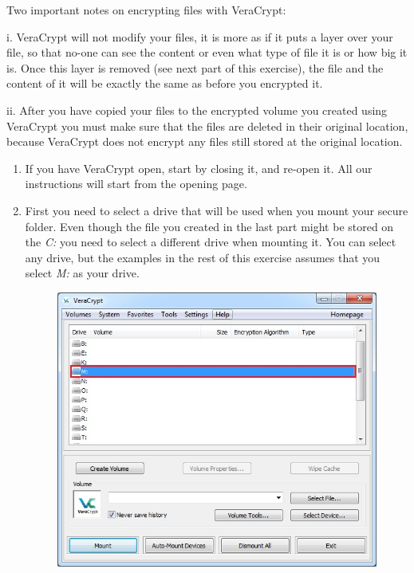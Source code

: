 \documentclass{tufte-handout}
\begin{document}
	Two important notes on encrypting files with VeraCrypt:
	
	i. VeraCrypt will not modify your files, it is more as if it puts a layer over your file, so that no-one can see the content or even what type of file it is or how big it is. Once this layer is removed (see next part of this exercise), the file and the content of it will be exactly the same as before you encrypted it.
	
	ii. After you have copied your files to the encrypted volume you created using VeraCrypt you must make sure that the files are deleted in their original location, because VeraCrypt does not encrypt any files still stored at the original location.
	

\begin{enumerate}
	\item If you have VeraCrypt open, start by closing it, and re-open it. All our instructions will start from the opening page.
	
	\item First you need to select a drive that will be used when you mount your secure folder. Even though the file you created in the last part might be stored on the \textit{C:} you need to select a different drive when mounting it. You can select any drive, but the examples in the rest of this exercise assumes that you select \textit{M:} as your drive.
	\begin{figure}%
		\includegraphics[width=.8\linewidth]{img/vc_mount_1.png}
	\end{figure}
	\FloatBarrier
	

\end{enumerate}
\end{document}
